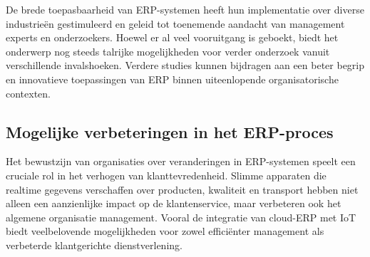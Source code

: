 De brede toepasbaarheid van ERP-systemen heeft hun implementatie over diverse industrieën gestimuleerd en geleid tot toenemende aandacht van management experts en onderzoekers. Hoewel er al veel vooruitgang is geboekt, biedt het onderwerp nog steeds talrijke mogelijkheden voor verder onderzoek vanuit verschillende invalshoeken. Verdere studies kunnen bijdragen aan een beter begrip en innovatieve toepassingen van ERP binnen uiteenlopende organisatorische contexten. \autocite{sheik2020enterprise}



\subsection{Mogelijke verbeteringen in het ERP-proces}
\label{sec:Mogelijke verbeteringen in het ERP-procesBP}

Het bewustzijn van organisaties over veranderingen in ERP-systemen speelt een cruciale rol in het verhogen van klanttevredenheid. Slimme apparaten die realtime gegevens verschaffen over producten, kwaliteit en transport hebben niet alleen een aanzienlijke impact op de klantenservice, maar verbeteren ook het algemene organisatie management. Vooral de integratie van cloud-ERP met IoT biedt veelbelovende mogelijkheden voor zowel efficiënter management als verbeterde klantgerichte dienstverlening. \autocite{tavana2020iot}

